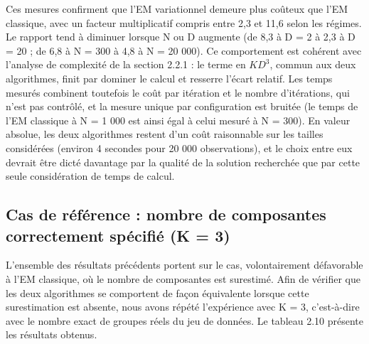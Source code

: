 Ces mesures confirment que l'EM variationnel demeure plus coûteux que l'EM classique, avec un facteur multiplicatif compris entre 2,3 et 11,6 selon les régimes. Le rapport tend à diminuer lorsque N ou D augmente (de 8,3 à D = 2 à 2,3 à D = 20 ; de 6,8 à N = 300 à 4,8 à N = 20 000). Ce comportement est cohérent avec l'analyse de complexité de la section 2.2.1 : le terme en $KD^{3}$, commun aux deux algorithmes, finit par dominer le calcul et resserre l'écart relatif. Les temps mesurés combinent toutefois le coût par itération et le nombre d'itérations, qui n'est pas contrôlé, et la mesure unique par configuration est bruitée (le temps de l'EM classique à N = 1 000 est ainsi égal à celui mesuré à N = 300). En valeur absolue, les deux algorithmes restent d'un coût raisonnable sur les tailles considérées (environ 4 secondes pour 20 000 observations), et le choix entre eux devrait être dicté davantage par la qualité de la solution recherchée que par cette seule considération de temps de calcul.

\subsection{Cas de référence : nombre de composantes correctement spécifié (K = 3)}
L'ensemble des résultats précédents portent sur le cas, volontairement défavorable à l'EM classique, où le nombre de composantes est surestimé. Afin de vérifier que les deux algorithmes se comportent de façon équivalente lorsque cette surestimation est absente, nous avons répété l'expérience avec K = 3, c'est-à-dire avec le nombre exact de groupes réels du jeu de données. Le tableau 2.10 présente les résultats obtenus.

